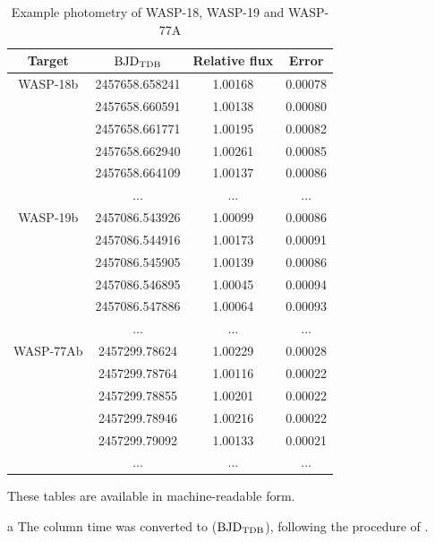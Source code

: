 \begin{table}[ht]
\caption{Example photometry of WASP-18, WASP-19 and WASP-77A}
\label{examplephot}
\centering
\begin{threeparttable}
\begin{tabular}{c c c c}
\hline \hline
Target & ${\rm BJD_{TDB}}$\tnote{a} & Relative flux & Error\\
\hline
    WASP-18b &  2457658.658241   & 1.00168 & 0.00078 \\
             &  2457658.660591   & 1.00138 & 0.00080 \\
             &  2457658.661771   & 1.00195 & 0.00082 \\
             &  2457658.662940   & 1.00261 & 0.00085 \\
             &  2457658.664109   & 1.00137 & 0.00086 \\\smallskip
      & ...           & ...         &    ... \\
    WASP-19b & 2457086.543926   & 1.00099 & 0.00086  \\
             & 2457086.544916   & 1.00173 & 0.00091  \\
             & 2457086.545905   & 1.00139 & 0.00086  \\
             & 2457086.546895   & 1.00045 & 0.00094  \\
             & 2457086.547886   & 1.00064 & 0.00093  \\\smallskip
     &  ...           & ...         &    ...  \\
WASP-77Ab & 2457299.78624 & 1.00229 & 0.00028 \\ 
         & 2457299.78764 & 1.00116 & 0.00022 \\
         & 2457299.78855 & 1.00201 & 0.00022 \\
         & 2457299.78946 & 1.00216 & 0.00022 \\
         & 2457299.79092 & 1.00133 & 0.00021 \\
         & ...           & ...         &    ... \\    
\hline
\end{tabular}
\begin{tablenotes}
\item These tables are available in machine-readable form.
\item[a]The column time was converted to (${\rm BJD_{TDB}}$), following the procedure of \cite{Eastman2010}.
\end{tablenotes}
\end{threeparttable}
\end{table}

